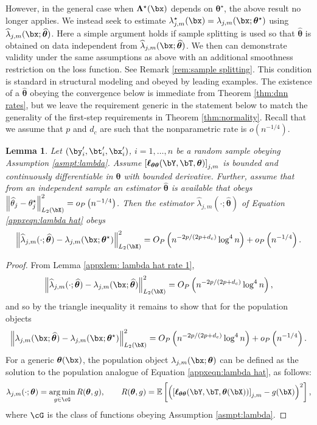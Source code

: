\documentclass[12pt]{article}
\newtheorem{lemma}{Lemma}
\numberwithin{equation}{section}
\theoremstyle{definition}
\DeclareMathOperator*{\argmin}{arg\,min}
\newcommand{\E}{\mathbb{E}}
\newcommand{\btheta}{\boldsymbol{\theta}}
\newcommand{\bL}{\boldsymbol{\Lambda}}
\newcommand{\ttrue}{\theta^\star}
\newcommand{\bttrue}{\btheta^\star}
\newcommand{\bLtrue}{\bL^\star}
\newcommand{\ltrue}{\lambda^\star}
\newcommand{\that}{\widehat{\theta}}
\newcommand{\bthat}{\bm{\widehat{\theta}}}
\newcommand{\lhat}{\widehat{\lambda}}
\newcommand{\dc}{d_c}  %
\begin{document}
\begin{appendices}
However, in the general case when $\bLtrue(\bx)$ depends on $\bttrue$, the above result no longer applies. We instead seek to estimate $\ltrue_{j,m}(\bx) = \lambda_{j,m}(\bx; \bttrue)$ using $\lhat_{j,m}(\bx; \bthat)$. Here a simple argument holds if sample splitting is used so that $\bthat$ is obtained on data independent from $\lhat_{j,m}(\bx; \bthat)$. We then can demonstrate validity under the same assumptions as above with an additional smoothness restriction on the loss function. See Remark \ref{rem:sample splitting}. This condition is standard in structural modeling and obeyed by leading examples. The existence of a $\bthat$ obeying the convergence below is immediate from Theorem \ref{thm:dnn rates}, but we leave the requirement generic in the statement below to match the generality of the first-step requirements in Theorem \ref{thm:normality}. Recall that we assume that $p$ and $\dc$ are such that the nonparametric rate is $o(n^{-1/4})$.
\begin{lemma}
	\label{appxlem: lambda hat rate 2}
Let $(\by_i', \bt_i', \bx_i')$, $i=1,\ldots, n$ be a random sample obeying Assumption \ref{asmpt:lambda}. Assume $\left[\bm{\ell}_{\btheta\btheta}(\bY,\bT, \btheta)\right]_{j,m}$ is bounded and continuously differentiable in $\btheta$ with bounded derivative. Further, assume that from an independent sample an estimator $\bthat$ is available that obeys $\left\| \that_j - \ttrue_j\right\|^2_{L_2(\bX)} = o_P \left(n^{-1/4} \right)$. Then the estimator $\lhat_{j,m}(\cdot; \bthat)$ of Equation \eqref{appxeqn:lambda hat} obeys
\[
	\left\| \lhat_{j,m}(\cdot; \bthat)  - \lambda_{j,m}(\bx; \bttrue) \right\|^2_{L_2(\bX)} = O_P \left(n^{-2p/(2p+\dc)} \log^4 n\right) + o_P \left(n^{-1/4} \right).
\]
\end{lemma}
\begin{proof}
	From Lemma \ref{appxlem: lambda hat rate 1},
	\[
		\left\| \lhat_{j,m}(\cdot; \bthat)  - \lambda_{j,m}(\bx; \bthat) \right\|^2_{L_2(\bX)} = O_P \left(n^{-2p/(2p+\dc)} \log^4 n\right),
	\]
	and so by the triangle inequality it remains to show that for the population objects
	\begin{equation}
		\label{appxeqn: lambda proof 1}
		\left\| \lambda_{j,m}(\bx; \bthat) - \lambda_{j,m}(\bx; \bttrue) \right\|^2_{L_2(\bX)} = O_P \left(n^{-2p/(2p+\dc)} \log^4 n\right) + o_P \left(n^{-1/4} \right).
	\end{equation}
	For a generic $\btheta(\bx)$, the population object $\lambda_{j,m}(\bx; \btheta)$ can be defined as the solution to the population analogue of Equation \eqref{appxeqn:lambda hat}, as follows:
	\[
		\lambda_{j,m}(\cdot; \btheta) = \argmin_{g \in \cG} R(\btheta, g)   , \qquad  R(\btheta, g) = \E \left[ \left( \left[\bm{\ell}_{\btheta\btheta}(\bY,\bT, \btheta(\bX))\right]_{j,m}  -  g(\bX)\right)^2 \right],
	\]
	where $\cG$ is the class of functions obeying Assumption \ref{asmpt:lambda}. 
	

\end{proof}
\end{appendices}
\end{document}
